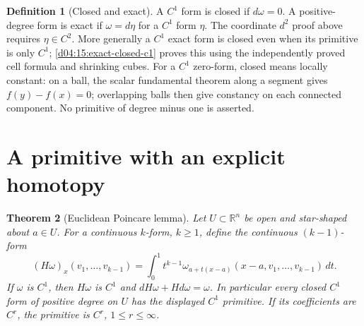 \documentclass[11pt,oneside,openany]{book}
\newtheorem{theorem}{Theorem}[chapter]
\theoremstyle{definition}
\newtheorem{definition}[theorem]{Definition}
\theoremstyle{remark}
\newcommand{\R}{\mathbb R}
\newcommand{\family}[1]{}
\begin{document}
\family{K04.13.08}\family{K04.13.10}
\begin{definition}[Closed and exact]\label{d04:13:closed-exact}
A $C^1$ form is closed if $d\omega=0$. A positive-degree form is exact if
$\omega=d\eta$ for a $C^1$ form $\eta$. The coordinate $d^2$ proof above
requires $\eta\in C^2$. More generally a $C^1$ exact form is closed even
when its primitive is only $C^1$; \cref{d04:15:exact-closed-c1} proves this
using the independently proved cell formula and shrinking cubes.
For a $C^1$ zero-form, closed means locally constant: on a ball, the scalar
fundamental theorem along a segment gives $f(y)-f(x)=0$; overlapping balls
then give constancy on each connected component. No primitive of degree
minus one is asserted.
\end{definition}

\section{A primitive with an explicit homotopy}
\family{K04.13.09}
\begin{theorem}[Euclidean Poincare lemma]\label{d04:13:poincare}
Let $U\subset\R^n$ be open and star-shaped about $a\in U$.
For a continuous $k$-form, $k\ge1$, define the continuous $(k-1)$-form
\[
 (H\omega)_x(v_1,\ldots,v_{k-1})=
 \int_0^1 t^{k-1}\omega_{a+t(x-a)}(x-a,v_1,\ldots,v_{k-1})\,dt.
\]
If $\omega$ is $C^1$, then $H\omega$ is $C^1$ and
$dH\omega+H d\omega=\omega$. In particular every closed $C^1$ form of
positive degree on $U$ has the displayed $C^1$ primitive. If its coefficients
are $C^r$, the primitive is $C^r$, $1\le r\le\infty$.
\end{theorem}
\end{document}
